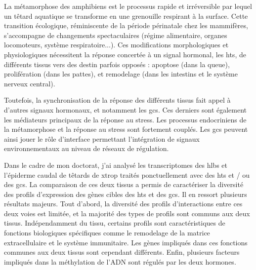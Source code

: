 % 
% 
%
La métamorphose des amphibiens est le processus rapide et irréversible par lequel un têtard aquatique se transforme en une grenouille respirant à la surface.
Cette transition écologique, réminiscente de la période périnatale chez les mammifères, s'accompagne de changements spectaculaires (régime alimentaire, organes locomoteurs, système respiratoire...).
Ces modifications morphologiques et physiologiques nécessitent la réponse concertée à un signal hormonal, les \glspl{ht}, de différents tissus vers des destin parfois opposés :
apoptose (dans la queue), prolifération (dans les pattes), et remodelage (dans les intestins et le système nerveux central).
\par
Toutefois, la synchronisation de la réponse des différents tissus fait appel à d'autres signaux hormonaux, et notamment les \glspl{gc}.
Ces derniers sont également les médiateurs principaux de la réponse au stress.
Les processus endocriniens de la métamorphose et la réponse au stress sont fortement couplés.
Les \glspl{gc} peuvent ainsi jouer le rôle d'interface permettant l'intégration de signaux environnementaux au niveau de réseaux de régulation.
\par
Dans le cadre de mon doctorat, j'ai analysé les transcriptomes des \glspl{hlb} et l'épiderme caudal de têtards de \gls{xtrop} traités ponctuellement avec des \glspl{ht} et / ou des \glspl{gc}.
La comparaison de ces deux tissus a permis de caractériser la diversité des profils d'expression des gènes cibles des \glspl{ht} et des \glspl{gc}.
Il en ressort plusieurs résultats majeurs.
Tout d'abord, la diversité des profils d'interactions entre ces deux voies est limitée, et la majorité des types de profils sont communs aux deux tissus.
Indépendamment du tissu, certains profils sont caractéristiques de fonctions biologiques spécifiques comme le remodelage de la matrice extracellulaire et le système immunitaire.
Les gènes impliqués dans ces fonctions communes aux deux tissus sont cependant différents.
Enfin, plusieurs facteurs impliqués dans la méthylation de l'ADN sont régulés par les deux hormones.